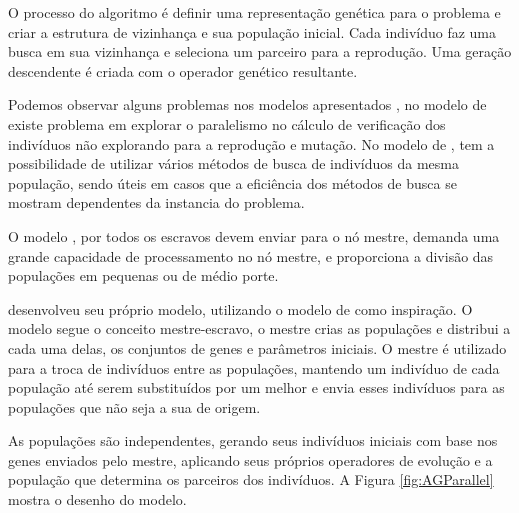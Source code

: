 O processo do algoritmo é definir uma representação genética para o problema e criar a estrutura de vizinhança e sua população inicial. Cada indivíduo faz uma busca em sua vizinhança e seleciona um parceiro para a reprodução. Uma geração descendente é criada com o operador genético resultante. \cite{Heinz}

Podemos observar alguns problemas nos modelos apresentados \cite{Vilson}, no modelo de \cite{Jason} existe problema em explorar o paralelismo no cálculo de verificação dos indivíduos não explorando para a reprodução e mutação. No modelo de \cite{Heinz}, tem a possibilidade de utilizar vários métodos de busca de indivíduos da mesma população, sendo úteis em casos que a eficiência dos métodos de busca se mostram dependentes da instancia do problema. 

O modelo \cite{Alaoui}, por todos os escravos devem enviar para o nó mestre, demanda uma grande capacidade de processamento no nó mestre, e proporciona a divisão das populações em pequenas ou de médio porte.

 \cite{Vilson} desenvolveu seu próprio modelo, utilizando o modelo de \cite{Alaoui} como inspiração. O modelo segue o conceito mestre-escravo, o mestre crias as populações e distribui a cada uma delas, os conjuntos de genes e parâmetros iniciais. O mestre é utilizado para a troca de indivíduos entre as populações, mantendo um indivíduo de cada população até serem substituídos por um melhor e envia esses indivíduos para as populações que não seja a sua de origem. 
 
 As populações são independentes, gerando seus indivíduos iniciais com base nos genes enviados pelo mestre, aplicando seus próprios operadores de evolução e a população que determina os parceiros dos indivíduos.
 A Figura \ref{fig:AGParallel} mostra o desenho do modelo.
 
 \begin{minipage}{\linewidth}
 	\label{fig:AGParallel}
 \end{minipage}
 